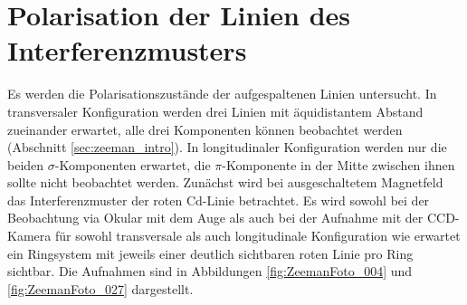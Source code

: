 
\section{Polarisation der Linien des Interferenzmusters}

Es werden die Polarisationszustände der aufgespaltenen Linien untersucht. In transversaler Konfiguration werden drei Linien mit äquidistantem Abstand zueinander erwartet, alle drei Komponenten können beobachtet werden (Abschnitt \ref{sec:zeeman_intro}). In longitudinaler Konfiguration werden nur die beiden $\sigma$-Komponenten erwartet, die $\pi$-Komponente in der Mitte zwischen ihnen sollte nicht beobachtet werden.
Zunächst wird bei ausgeschaltetem Magnetfeld das Interferenzmuster der roten Cd-Linie betrachtet. Es wird sowohl bei der Beobachtung via Okular mit dem Auge als auch bei der Aufnahme mit der CCD-Kamera für sowohl transversale als auch longitudinale Konfiguration wie erwartet ein Ringsystem mit jeweils einer deutlich sichtbaren roten Linie pro Ring sichtbar. Die Aufnahmen sind in Abbildungen \ref{fig:ZeemanFoto_004} und \ref{fig:ZeemanFoto_027} dargestellt.





